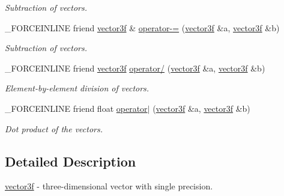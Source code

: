 \begin{DoxyCompactItemize}
\begin{DoxyCompactList}\small\item\em Subtraction of vectors. \end{DoxyCompactList}\item 
\hypertarget{classbt_1_1vector3f_a99e55cee48055121efb8a2db7d1b8120}{\-\_\-\-F\-O\-R\-C\-E\-I\-N\-L\-I\-N\-E friend \hyperlink{classbt_1_1vector3f}{vector3f} \& \hyperlink{classbt_1_1vector3f_a99e55cee48055121efb8a2db7d1b8120}{operator-\/=} (\hyperlink{classbt_1_1vector3f}{vector3f} \&a, \hyperlink{classbt_1_1vector3f}{vector3f} \&b)}\label{classbt_1_1vector3f_a99e55cee48055121efb8a2db7d1b8120}

\begin{DoxyCompactList}\small\item\em Subtraction of vectors. \end{DoxyCompactList}\item 
\hypertarget{classbt_1_1vector3f_a1fb252ca68f5a7ccbc030da933165e69}{\-\_\-\-F\-O\-R\-C\-E\-I\-N\-L\-I\-N\-E friend \hyperlink{classbt_1_1vector3f}{vector3f} \hyperlink{classbt_1_1vector3f_a1fb252ca68f5a7ccbc030da933165e69}{operator/} (\hyperlink{classbt_1_1vector3f}{vector3f} \&a, \hyperlink{classbt_1_1vector3f}{vector3f} \&b)}\label{classbt_1_1vector3f_a1fb252ca68f5a7ccbc030da933165e69}

\begin{DoxyCompactList}\small\item\em Element-\/by-\/element division of vectors. \end{DoxyCompactList}\item 
\hypertarget{classbt_1_1vector3f_a08cf73a7fadac4cb16523f133e129edc}{\-\_\-\-F\-O\-R\-C\-E\-I\-N\-L\-I\-N\-E friend float \hyperlink{classbt_1_1vector3f_a08cf73a7fadac4cb16523f133e129edc}{operator$|$} (\hyperlink{classbt_1_1vector3f}{vector3f} \&a, \hyperlink{classbt_1_1vector3f}{vector3f} \&b)}\label{classbt_1_1vector3f_a08cf73a7fadac4cb16523f133e129edc}

\begin{DoxyCompactList}\small\item\em Dot product of the vectors. \end{DoxyCompactList}\end{DoxyCompactItemize}


\subsection{Detailed Description}
\hyperlink{classbt_1_1vector3f}{vector3f} -\/ three-\/dimensional vector with single precision. 

